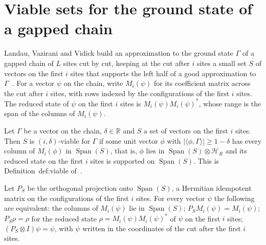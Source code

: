 \section{Viable sets for the ground state of a gapped chain}
\label{sec:lvv_viable_sets}

Landau, Vazirani and Vidick build an approximation to the ground state
$\Gamma$ of a gapped chain of $L$ sites cut by cut, keeping at the cut after
$i$ sites a small set $S$ of vectors on the first $i$ sites that supports the
left half of a good approximation to
$\Gamma$~\cite[lines 240--244]{Landau2015Polynomial}. For a vector $\psi$ on
the chain, write $M_i(\psi)$ for its coefficient matrix across the cut after
$i$ sites, with rows indexed by the configurations of the first $i$ sites.
The reduced state of $\psi$ on the first $i$ sites is $M_i(\psi)M_i(\psi)^*$,
whose range is the span of the columns of $M_i(\psi)$.

\begin{definition}
    \label{def:lvv_viable_set}
    \leanok
    Let $\Gamma$ be a vector on the chain, $\delta\in\mathbb R$ and $S$ a set of
    vectors on the first $i$ sites. Then $S$ is $(i,\delta)$-viable for $\Gamma$
    if some unit vector $\phi$ with $|\langle\phi,\Gamma\rangle|\ge1-\delta$ has
    every column of $M_i(\phi)$ in $\operatorname{Span}(S)$, that is, $\phi$ lies
    in $\operatorname{Span}(S)\otimes\mathcal H_R$ and its reduced state on the
    first $i$ sites is supported on $\operatorname{Span}(S)$. This is
    Definition~def:viable of~\cite[lines 240--242]{Landau2015Polynomial}.
\end{definition}

\begin{lemma}
    \label{thm:lvv_viable_projection}
    \leanok
    Let $P_S$ be the orthogonal projection onto $\operatorname{Span}(S)$, a
    Hermitian idempotent matrix on the configurations of the first $i$ sites.
    For every vector $\psi$ the following are equivalent: the columns of
    $M_i(\psi)$ lie in $\operatorname{Span}(S)$; $P_SM_i(\psi)=M_i(\psi)$;
    $P_S\rho=\rho$ for the reduced state $\rho=M_i(\psi)M_i(\psi)^*$ of $\psi$ on
    the first $i$ sites; $(P_S\otimes I)\psi=\psi$, with $\psi$ written in the
    coordinates of the cut after the first $i$ sites.
\end{lemma}

